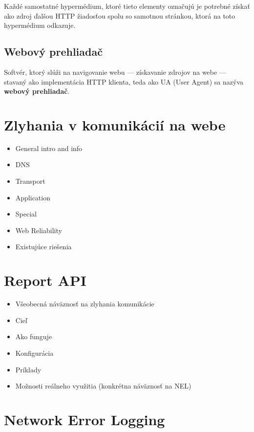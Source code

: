 Každé samostatné hypermédium, ktoré tieto elementy označujú je potrebné získať ako zdroj ďalšou HTTP žiadosťou spolu so samotnou stránkou, ktorá na toto hypermédium odkazuje.

\subsection{Webový prehliadač}
\label{webovy-prehliadac}

Softvér, ktorý slúži na navigovanie webu --- získavanie zdrojov na webe --- stavaný ako implementácia HTTP klienta, teda ako UA (User Agent) sa nazýva \textbf{webový prehliadač}.


\section{Zlyhania v komunikácií na webe}
\begin{itemize}
    \item General intro and info
    \item DNS
    \item Transport
    \item Application
    \item Special
    \item Web Reliability
    \item Existujúce riešenia
\end{itemize}

\section{Report API}
\begin{itemize}
    \item Všeobecná náväznosť na zlyhania komunikácie
    \item Cieľ
    \item Ako funguje
    \item Konfigurácia
    \item Príklady
    \item Možnosti reálneho využitia (konkrétna náväznosť na NEL)
\end{itemize}

\section{Network Error Logging}

